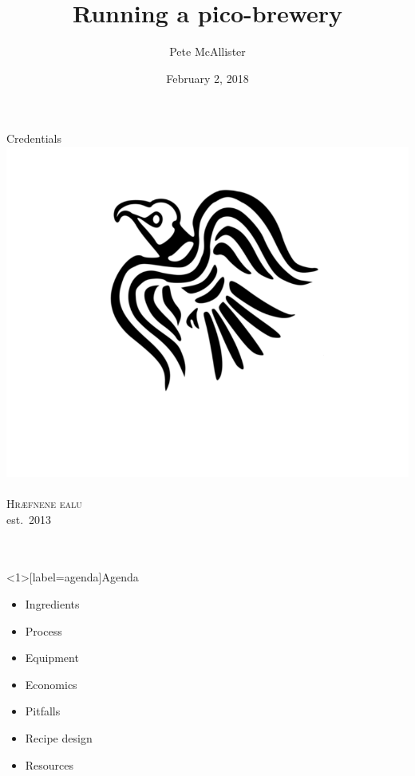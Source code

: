 \documentclass{beamer}
\title{Running a pico-brewery}
\author{Pete McAllister}
\date{February 2, 2018}
\begin{document}
\frame{
\maketitle
}

\begin{frame}{Credentials}
  \centering
  \includegraphics[height=0.5\textheight]{hraefn.png}\\[-0.1\textheight]
  \\ %
  \textsc{Hr\ae{}fnene ealu}\\
  est.\ 2013\\\bigskip
  \\
  \\
\end{frame}

\begin{frame}<1>[label=agenda]{Agenda}
  \begin{itemize}
  \item \alert<2>{Ingredients}
  \item \alert<3>{Process}
  \item \alert<4>{Equipment}
  \item \alert<5>{Economics}
  \item \alert<6>{Pitfalls}
  \item \alert<7>{Recipe design}
  \item \alert<8>{Resources}
  \end{itemize}
\end{frame}
\end{document}
